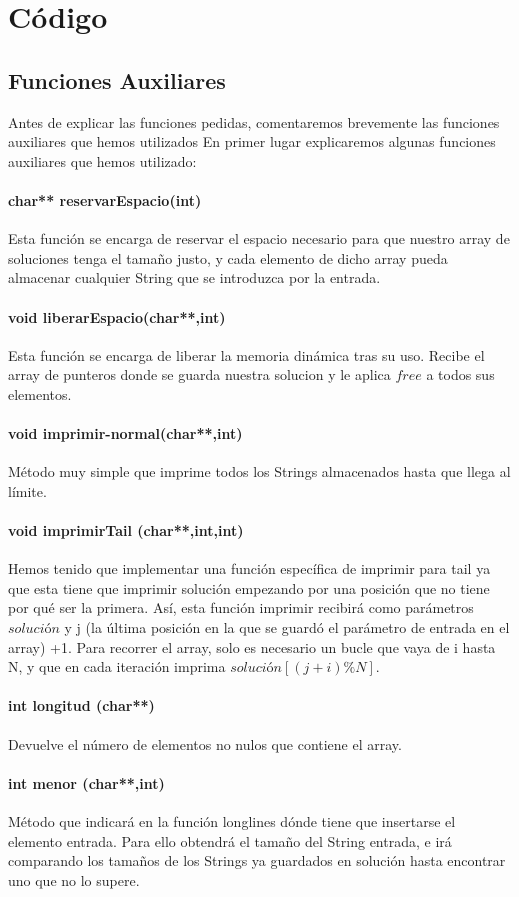 \chapter{Código}
\section{Funciones Auxiliares}
Antes de explicar las funciones pedidas, comentaremos brevemente las funciones auxiliares que hemos utilizados
En primer lugar explicaremos algunas funciones auxiliares que hemos utilizado: 
\subsubsection{char** reservarEspacio(int)}
Esta función se encarga de reservar el espacio necesario para que nuestro array de soluciones tenga el tamaño justo, y cada elemento de dicho array pueda almacenar cualquier String que se introduzca por la entrada.
\subsubsection{void liberarEspacio(char**,int)}
Esta función se encarga de liberar la memoria dinámica tras su uso. Recibe el array de punteros donde se guarda nuestra solucion y le aplica $free$ a todos sus elementos.
\subsubsection{void imprimir-normal(char**,int)}
Método muy simple que imprime todos los Strings almacenados hasta que llega al límite.
\subsubsection{void imprimirTail (char**,int,int)}
Hemos tenido que implementar una función específica de imprimir para tail ya que esta tiene que imprimir solución empezando por una posición que no tiene por qué ser la primera.
Así, esta función imprimir recibirá como parámetros $solución$ y j (la última posición en la que se guardó el parámetro de entrada en el array) +1. Para recorrer el array, solo es necesario un bucle que vaya de i hasta N, y que en cada iteración imprima $solución[(j+i)\%N]$.
\subsubsection{int longitud (char**)}
Devuelve el número de elementos no nulos que contiene el array.
\subsubsection{int menor (char**,int)}
Método que indicará en la función longlines dónde tiene que insertarse el elemento entrada. Para ello obtendrá el tamaño del String entrada, e irá comparando los tamaños de los Strings ya guardados en solución hasta encontrar uno que no lo supere.
